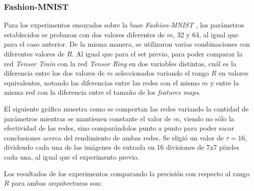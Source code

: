 \documentclass[spanish]{article}
\theoremstyle{definition}
\theoremstyle{remark}
\numberwithin{equation}{section}
\numberwithin{equation}{section} %
\begin{document}
\subsubsection{Fashion-MNIST}
Para los experimentos ensayados sobre la base \textit{Fashion-MNIST} \cite{xiao2017fashion}, los parámetros establecidos se probaron con dos valores diferentes de $m$, 32 y 64, al igual que para el caso anterior. De la misma manera, se utilizaron varias combinaciones con diferentes valores de $R$. Al igual que para el set previo, para poder comparar la red \textit{Tensor Train} con la red \textit{Tensor Ring} en dos variables distintas, cuál es la diferencia entre los dos valores de $m$ seleccionados variando el rango $R$ en valores equivalentes, notando las diferencias entre las redes con el mismo $m$ y entre la misma red con la diferencia entre el tamaño de los \textit{features maps}. \par 
El siguiente gráfico muestra como se comportan las redes variando la cantidad de parámetros mientras se mantienen constante el valor de $m$, viendo no sólo la efectividad de las redes, sino comparándolos punto a punto para poder sacar conclusiones acerca del rendimiento de ambas redes. Se eligió un valor de $\tau = 16$, dividendo cada una de las imágenes de entrada en 16 divisiones de 7x7 píxeles cada una, al igual que el experimento previo.\par
Los resultados de los experimentos comparando la precisión con respecto al rango $R$ para ambas arquitecturas son:
\end{document}
